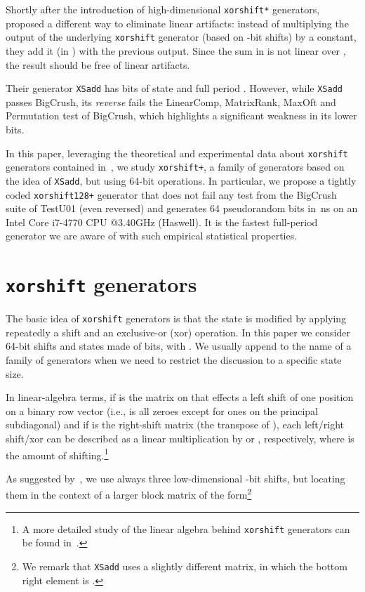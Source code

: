 \documentclass{acmsmalltr}
\newcommand{\xorshift}[1][]{\texttt{xorshift#1}\xspace}
\newcommand{\xorshifts}[1][]{\texttt{xorshift#1*}\xspace}
\newcommand{\xorshiftp}[1][]{\texttt{xorshift#1+}\xspace}
\newcommand{\xsadd}{\texttt{XSadd}\xspace}
\begin{document}
Shortly after the introduction of high-dimensional \xorshifts generators,
 proposed a different way to eliminate linear artifacts: instead of
multiplying the output of the underlying \xorshift generator (based on -bit shifts) by a
constant, they add it (in ) with the previous output. Since the sum
in  is not linear over , the result should be
free of linear artifacts.

Their generator \xsadd has  bits of state and full period .
However, while \xsadd passes BigCrush, its \emph{reverse} fails
the LinearComp, MatrixRank, MaxOft and Permutation test of
BigCrush, which highlights a significant weakness in its lower bits.

In this paper, leveraging the theoretical and experimental data about \xorshift
generators contained in~\cite{VigEEMXGS}, we study \xorshiftp, a family of
generators based on the idea of \xsadd, but using 64-bit operations. In
particular, we propose a tightly coded \xorshiftp[128] generator that
does not fail any test from the BigCrush suite of TestU01
(even reversed) and generates 64 pseudorandom bits in \,ns on an
Intel\textregistered{} Core\texttrademark{} i7-4770 CPU @3.40GHz (Haswell). It
is the fastest full-period generator we are aware of with such empirical
statistical properties.



\section{{\fontsize{11pt}{11pt}\selectfont\xorshift} generators}

The basic idea of \xorshift generators is that the state is modified by
applying repeatedly a shift and an exclusive-or (xor) operation. In this paper we consider
64-bit shifts and states made of  bits, with . We usually
append  to the name of a family of generators when we need to restrict the discussion to a specific state size.

In linear-algebra terms, if  is the  matrix on  that
effects a left shift of one position on a binary row vector (i.e.,  is all zeroes except for ones on the
principal subdiagonal) and if  is the right-shift
matrix (the transpose of ), each left/right shift/xor can be described as a linear multiplication
by  or , respectively, where  is the
amount of shifting.\footnote{A more detailed study of the linear algebra behind \xorshift generators can be found in~\cite{MarXR,PaLXRNG}.}

As suggested by~, we use always three low-dimensional
-bit shifts, but locating them in the context of a larger block matrix of the
form\footnote{We remark that \xsadd uses a slightly different matrix, in which the bottom right
element is .}
\end{document}

